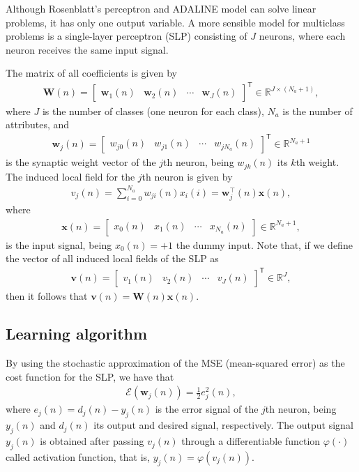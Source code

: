 \documentclass[12pt,a4paper]{article}
\newcommand{\trans}{\mathsf{T}}
\newcommand{\Real}{\mathbb{R}}
\begin{document}
Although Rosenblatt's perceptron and ADALINE model can solve linear problems, it has only one output variable. A more sensible model for multiclass problems is a single-layer perceptron (SLP) consisting of \(J\) neurons, where each neuron receives the same input signal.

The matrix of all coefficients is given by
\begin{align}
    \mathbf{W}(n) = \begin{bmatrix}
        \mathbf{w}_1 (n) & \mathbf{w}_2 (n) & \cdots & \mathbf{w}_J (n)
    \end{bmatrix}^\trans \in \Real^{J \times \left(N_a+1\right)},
\end{align}
where \(J\) is the number of classes (one neuron for each class), \(N_a\) is the number of attributes, and
\begin{align}
    \mathbf{w}_j (n) = \begin{bmatrix}
        w_{j0} (n) & w_{j1} (n) & \cdots & w_{j N_a} (n)
    \end{bmatrix}^\trans \in \Real^{N_a+1}
\end{align}
is the synaptic weight vector of the \(j\)th neuron, being \(w_{jk} (n)\) its \(k\)th weight. The induced local field for the \(j\)th neuron is given by
\begin{align}
    v_j(n) = \sum_{i=0}^{N_a} w_{ji}(n) x_i (i) = \mathbf{w}_j^\top (n) \mathbf{x}(n),
\end{align}
where
\begin{align}
    \mathbf{x}(n) = \begin{bmatrix}
        x_0 (n) & x_1 (n) & \cdots & x_{N_a} (n)
    \end{bmatrix} \in \mathbb{R}^{N_a+1},
\end{align}
is the input signal, being \(x_{0} (n) = +1\) the dummy input. Note that, if we define the vector of all induced local fields of the SLP as
\begin{align}
    \mathbf{v}(n) = \begin{bmatrix}
        v_1(n) & v_2(n) & \cdots & v_J(n)
    \end{bmatrix}^\trans \in \mathbb{R}^{J} ,
\end{align}
then it follows that \(\mathbf{v}(n) = \mathbf{W}(n) \mathbf{x}(n)\).

\subsection{Learning algorithm}
By using the stochastic approximation of the MSE (mean-squared error) as the cost function for the SLP, we have that
\begin{align}
    \label{eq:stochastic-cost-func}
    \mathscr{E}(\mathbf{w}_j(n)) = \frac{1}{2} e^2_j(n),
\end{align}
where \(e_j(n) = d_j(n) - y_j(n)\) is the error signal of the \(j\)th neuron, being \(y_j(n)\) and \(d_j(n)\) its output and desired signal, respectively. The output signal \(y_j(n)\) is obtained after passing \(v_j(n)\) through a differentiable function \(\varphi(\cdot)\) called activation function, that is, \(y_j(n) = \varphi(v_j(n))\).
\end{document}

